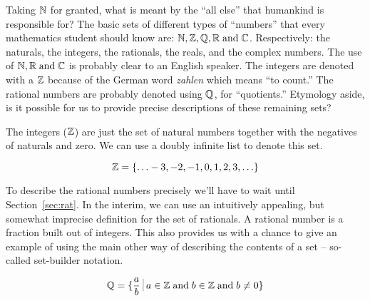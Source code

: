 Taking ${\mathbb N}$ for granted, what is meant by the ``all else''
that humankind is responsible for?  The basic sets of different types
of ``numbers'' that every mathematics student should know are: ${\mathbb N},
{\mathbb Z}, {\mathbb Q}, {\mathbb R}
\; \mbox{and} \; {\mathbb C}$.  Respectively: the naturals, the integers, the
rationals, the reals, and the complex numbers.  The use of ${\mathbb N},
{\mathbb R} \; \mbox{and} \; {\mathbb C}$ is probably clear to an English
speaker.  The integers are denoted with a ${\mathbb Z}$ because of the
German word {\em zahlen} which means ``to count.''   The rational numbers are
probably denoted using ${\mathbb Q}$, for ``quotients.''  Etymology
aside, is it possible for us to provide precise descriptions of these
remaining sets?  

The  integers (${\mathbb Z}$) are just the set of natural numbers
together with the negatives of naturals and zero.  We can use
a doubly infinite list to denote this set.

\[ {\mathbb Z} = \{ \ldots -3, -2, -1, 0, 1, 2, 3, \ldots \} \]


To describe the  rational numbers precisely we'll have to wait until Section~\ref{sec:rat}.
In the interim, we can use an intuitively appealing, but somewhat imprecise
definition for the set of rationals.  A rational number is a fraction built out
of integers.   This also provides us with
a chance to give an example of using the main other way of describing
the contents of a set -- so-called  set-builder notation.

\[ \Rationals = \{ \frac{a}{b} \suchthat a \in \Integers \; \mbox{and} \;
b \in \Integers \; \mbox{and} \; b \neq 0 \} \]

